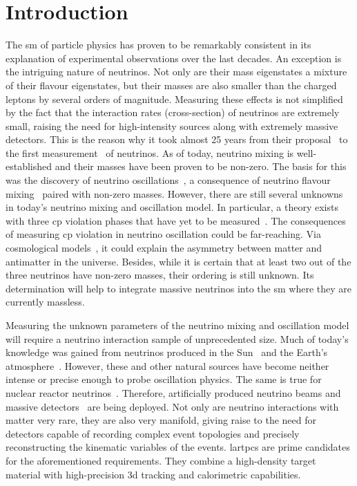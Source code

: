 \chapter{Introduction}
\label{chap:introduction}

The \gls{sm} of particle physics has proven to be remarkably consistent in its explanation of experimental observations over the last decades.
An exception is the intriguing nature of neutrinos.
Not only are their mass eigenstates a mixture of their flavour eigenstates, but their masses are also smaller than the charged leptons by several orders of magnitude.
Measuring these effects is not simplified by the fact that the interaction rates (cross-section) of neutrinos are extremely small, raising the need for high-intensity sources along with extremely massive detectors.
This is the reason why it took almost \num{25} years from their proposal~\cite{pauliLetter} to the first measurement~\cite{reinesCowan} of neutrinos.
As of today, neutrino mixing is well-established and their masses have been proven to be non-zero.
The basis for this was the discovery of neutrino oscillations~\cite{superKAtmos1, superKAtmos2, snoSolar}, a consequence of neutrino flavour mixing~\cite{pontecorvo, makiNakagawaSakata} paired with non-zero masses.
However, there are still several unknowns in today's neutrino mixing and oscillation model.
In particular, a theory exists with three \gls{cp} violation phases that have yet to be measured~\cite{pontecorvo, makiNakagawaSakata, mariuana}.
The consequences of measuring \gls{cp} violation in neutrino oscillation could be far-reaching.
Via cosmological models~\cite{pdg}, it could explain the asymmetry between matter and antimatter in the universe.
Besides, while it is certain that at least two out of the three neutrinos have non-zero masses, their ordering is still unknown.
Its determination will help to integrate massive neutrinos into the \gls{sm} where they are currently massless.

Measuring the unknown parameters of the neutrino mixing and oscillation model will require a neutrino interaction sample of unprecedented size.
Much of today's knowledge was gained from neutrinos produced in the Sun~\cite{homestake68, homestake98, snoSolar} and the Earth's atmosphere~\cite{superKAtmos1, superKAtmos2}.
However, these and other natural sources have become neither intense or precise enough to probe oscillation physics.
The same is true for nuclear reactor neutrinos~\cite{reinesCowan, dayabayRecent}.
Therefore, artificially produced neutrino beams and massive detectors~\cite{t2kOsc} are being deployed.
Not only are neutrino interactions with matter very rare, they are also very manifold, giving raise to the need for detectors capable of recording complex event topologies and precisely reconstructing the kinematic variables of the events.
\glspl{lartpc} are prime candidates for the aforementioned requirements.
They combine a high-density target material with high-precision \gls{3d} tracking and calorimetric capabilities.

